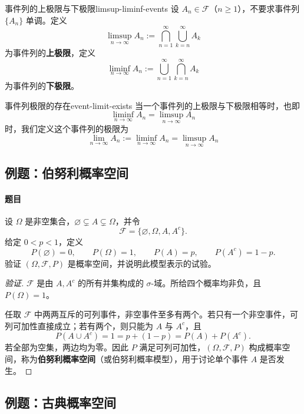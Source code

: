 \begin{mydefinition}{事件列的上极限与下极限}{limsup-liminf-events}
设 $A_n\in\mathscr{F}$（$n\geq1$），不要求事件列 $\{A_n\}$ 单调。定义
\[
\limsup_{n\to\infty}A_n
:=\bigcap_{n=1}^{\infty}\bigcup_{k=n}^{\infty}A_k
\]
为事件列的\textbf{上极限}，定义
\[
\liminf_{n\to\infty}A_n
:=\bigcup_{n=1}^{\infty}\bigcap_{k=n}^{\infty}A_k
\]
为事件列的\textbf{下极限}。
\end{mydefinition}

\begin{mydefinition}{事件列极限的存在}{event-limit-exists}
	当一个事件列的上极限与下极限相等时，也即
	\[\liminf_{n\to\infty}A_n =\limsup_{n\to\infty}A_n\]
	时，我们定义这个事件列的极限为
	\[\lim\limits_{n\to\infty}A_n :=\liminf_{n\to\infty}A_n =\limsup_{n\to\infty}A_n\]
\end{mydefinition}

\subsection{例题：伯努利概率空间}\label{note:c1:e7}
\paragraph{题目}
设 $\Omega$ 是非空集合，$\varnothing\subsetneq A\subsetneq\Omega$，并令
\[
\mathscr{F}=\{\varnothing,\Omega,A,A^c\}.
\]
给定 $0<p<1$，定义
\[
P(\varnothing)=0,\qquad P(\Omega)=1,
\qquad P(A)=p,\qquad P(A^c)=1-p.
\]
验证 $(\Omega,\mathscr F,P)$ 是概率空间，并说明此模型表示的试验。

\begin{proof}[验证]
$\mathscr F$ 是由 $A,A^c$ 的所有并集构成的 $\sigma$-域。所给四个概率均非负，且 $P(\Omega)=1$。

任取 $\mathscr F$ 中两两互斥的可列事件，非空事件至多有两个。若只有一个非空事件，可列可加性直接成立；若有两个，则只能为 $A$ 与 $A^c$，且
\[P(A\cup A^c)=1=p+(1-p)=P(A)+P(A^c).\]
若全部为空集，两边均为零。因此 $P$ 满足可列可加性，$(\Omega,\mathscr F,P)$ 构成概率空间，称为\textbf{伯努利概率空间}（或伯努利概率模型），用于讨论单个事件 $A$ 是否发生。
\end{proof}

\subsection{例题：古典概率空间}\label{note:c1:e8}
